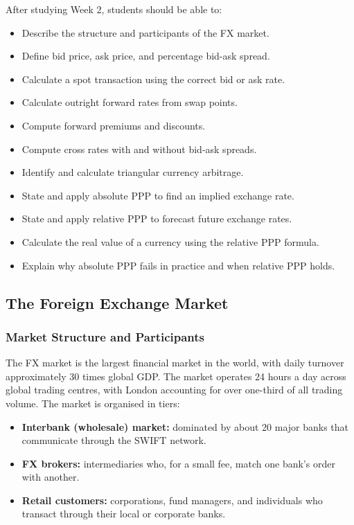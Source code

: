 \documentclass[11pt,a4paper]{article}
\begin{document}
After studying Week 2, students should be able to:
\begin{itemize}
  \item Describe the structure and participants of the FX market.
  \item Define bid price, ask price, and percentage bid-ask spread.
  \item Calculate a spot transaction using the correct bid or ask rate.
  \item Calculate outright forward rates from swap points.
  \item Compute forward premiums and discounts.
  \item Compute cross rates with and without bid-ask spreads.
  \item Identify and calculate triangular currency arbitrage.
  \item State and apply absolute PPP to find an implied exchange rate.
  \item State and apply relative PPP to forecast future exchange rates.
  \item Calculate the real value of a currency using the relative PPP formula.
  \item Explain why absolute PPP fails in practice and when relative PPP holds.
\end{itemize}

\subsection{The Foreign Exchange Market}

\subsubsection{Market Structure and Participants}

The FX market is the largest financial market in the world, with daily turnover approximately 30 times global GDP. The market operates 24 hours a day across global trading centres, with London accounting for over one-third of all trading volume. The market is organised in tiers:

\begin{itemize}
  \item \textbf{Interbank (wholesale) market:} dominated by about 20 major banks that communicate through the SWIFT network.
  \item \textbf{FX brokers:} intermediaries who, for a small fee, match one bank's order with another.
  \item \textbf{Retail customers:} corporations, fund managers, and individuals who transact through their local or corporate banks.
\end{itemize}
\end{document}
